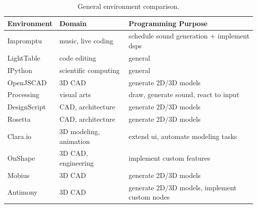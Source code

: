 \begin{table}
	\centering
	\renewcommand{\arraystretch}{1.2}

	\begin{tabulary}{\textwidth}{lLL}
		\toprule
		{\bf Environment}	& {\bf Domain} 						& {\bf Programming Purpose}												\\
		\midrule
		Impromptu			& music, live coding			& schedule sound generation + implement \glspl{dsp}	\\
		LightTable		& code editing						& general																					\\
		IPython				& scientific computing		& general																					\\
		OpenJSCAD			& 3D CAD									& generate 2D/3D models														\\
		Processing		& visual arts							& draw, generate sound, react to input						\\
		DesignScript	& CAD, architecture				& generate 2D/3D models														\\
		Rosetta				& CAD, architecture				& generate 2D/3D models														\\
		Clara.io			& 3D modeling, animation	& extend \gls{ui}, automate modeling tasks				\\
		OnShape				& 3D CAD, engineering			& implement custom features												\\
		Mobius				& 3D CAD									& generate 2D/3D models														\\
		Antimony			& 3D CAD									& generate 2D/3D models, implement custom nodes		\\
	\bottomrule
	\end{tabulary}

	\caption{General environment comparison.}
	\label{table:general:comp}
\end{table}

